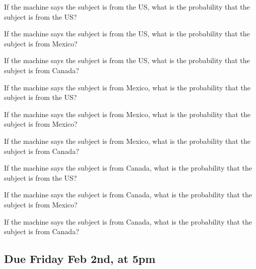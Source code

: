 \documentclass[11pt]{article}
\begin{document}
\begin{enumerate*}
\setcounter{enumi}{1}
\item If the machine says the subject is from the US, what is the probability that the subject is from the US?
\item If the machine says the subject is from the US, what is the probability that the subject is from Mexico?
\item If the machine says the subject is from the US, what is the probability that the subject is from Canada?
\item If the machine says the subject is from Mexico, what is the probability that the subject is from the US?
\item If the machine says the subject is from Mexico, what is the probability that the subject is from Mexico?
\item If the machine says the subject is from Mexico, what is the probability that the subject is from Canada?
\item If the machine says the subject is from Canada, what is the probability that the subject is from the US?
\item If the machine says the subject is from Canada, what is the probability that the subject is from Mexico?
\item If the machine says the subject is from Canada, what is the probability that the subject is from Canada?
\end{enumerate*}

\subsection*{Due Friday Feb 2nd, at 5pm}
\end{document}
